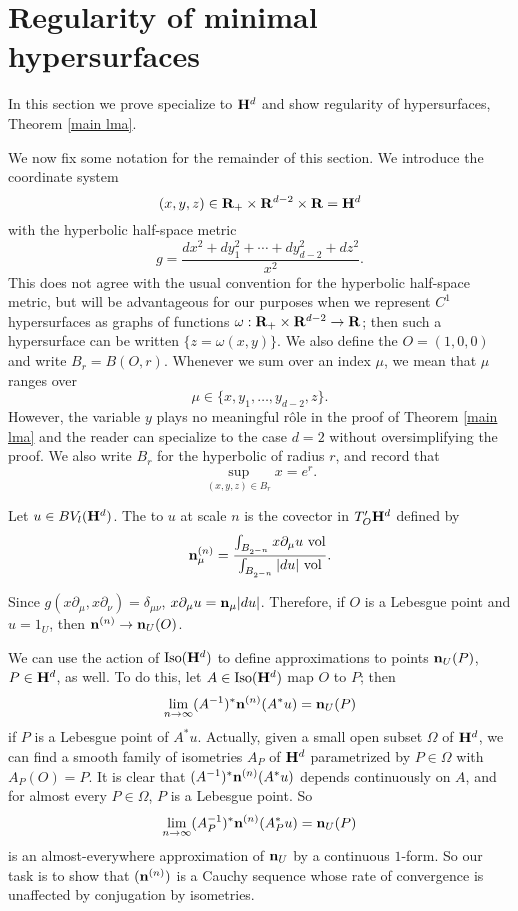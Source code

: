 \section{Regularity of minimal hypersurfaces}\label{DeGiorgiSection}
In this section we prove specialize to $\mathbf H^d$ and show regularity of hypersurfaces, Theorem \ref{main lma}.

We now fix some notation for the remainder of this section.
We introduce the coordinate system
$$(x, y, z) \in \mathbf{R}_+ \times \mathbf{R}^{d - 2} \times \mathbf{R} = \mathbf H^d$$
with the hyperbolic half-space metric
\begin{equation}\label{hyperbolic metric}
g = \frac{dx^2 + dy_1^2 + \cdots + dy_{d - 2}^2 + dz^2}{x^2}.
\end{equation}
This does not agree with the usual convention for the hyperbolic half-space metric, but will be advantageous for our purposes when we represent $C^1$ hypersurfaces as graphs of functions $\omega: \mathbf{R}_+ \times \mathbf{R}^{d - 2} \to \mathbf{R}$; then such a hypersurface can be written $\{z = \omega(x, y)\}$.
We also define the  $O = (1, 0, 0)$ and write $B_r = B(O, r)$.
Whenever we sum over an index $\mu$, we mean that $\mu$ ranges over
$$\mu \in \{x, y_1, \dots, y_{d - 2}, z\}.$$
However, the variable $y$ plays no meaningful r\^ole in the proof of Theorem \ref{main lma} and the reader can specialize to the case $d = 2$ without oversimplifying the proof.
We also write $B_r$ for the hyperbolic of radius $r$, and record that
\begin{equation}\label{sup in a ball}
\sup_{(x, y, z) \in B_r} x = e^r.
\end{equation}

\begin{definition}
Let $u \in BV_l(\mathbf H^d)$. The  to $u$ at scale $n$ is the covector in $T_O' \mathbf H^d$ defined by
$$\mathbf n^{(n)}_\mu = \frac{\int_{B_{2^{-n}}} x \partial_\mu u ~\mathrm{vol}}{\int_{B_{2^{-n}}} |du| ~\mathrm{vol}}.$$
\end{definition}

Since $g(x\partial_\mu, x\partial_\nu) = \delta_{\mu\nu}$, $x\partial_\mu u = \mathbf n_\mu|du|$.
Therefore, if $O$ is a Lebesgue point and $u = 1_U$, then $\mathbf n^{(n)} \to \mathbf n_U(O)$.

We can use the action of $\operatorname{Iso}(\mathbf H^d)$ to define approximations to points $\mathbf n_U(P)$, $P \in \mathbf H^d$, as well.
To do this, let $A \in \operatorname{Iso}(\mathbf H^d)$ map $O$ to $P$; then
$$\lim_{n \to \infty} (A^{-1})^* \mathbf n^{(n)}(A^* u) = \mathbf n_U(P)$$
if $P$ is a Lebesgue point of $A^* u$.
Actually, given a small open subset $\Omega$ of $\mathbf H^d$, we can find a smooth family of isometries $A_P$ of $\mathbf H^d$ parametrized by $P \in \Omega$ with $A_P(O) = P$.
It is clear that $(A^{-1})^* \mathbf n^{(n)}(A^* u)$ depends continuously on $A$, and for almost every $P \in \Omega$, $P$ is a Lebesgue point.
So
$$\lim_{n \to \infty} (A_P^{-1})^* \mathbf n^{(n)}(A_P^* u) = \mathbf n_U(P)$$
is an almost-everywhere approximation of $\mathbf n_U$ by a continuous $1$-form.
So our task is to show that $(\mathbf n^{(n)})$ is a Cauchy sequence whose rate of convergence is unaffected by conjugation by isometries.

